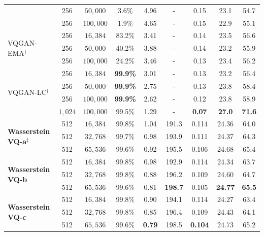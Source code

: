 \begin{table}[!t]
{\begin{tabular}{@{}lcccccccc@{}}
& 256 & $50{,}000$ & 3.6\%  & 4.96 & - & 0.15 & 23.1 & 54.7 \\
& 256 & $100{,}000$ & 1.9\%  & 4.65 & - & 0.15 & 22.9 & 55.1 \\
\midrule
\multirow{3}{*}{VQGAN-EMA$^{\dagger}$} & 256 & $16{,}384$ & 83.2\% & 3.41 & -  & 0.14 & 23.5 & 56.6 \\
& 256 & $50{,}000$ &  40.2\% & 3.88 & -  & 0.14 & 23.2 & 55.9 \\
& 256 & $100{,}000$ & 24.2\% & 3.46 & -  &  0.13 & 23.4 & 56.2 \\
\midrule
\multirow{4}{*}{VQGAN-LC$^{\dagger}$} & 256 & $16{,}384$ & \textbf{99.9\%}  & 3.01 & - & 0.13 & 23.2 & 56.4 \\
 & 256 & $50{,}000$ & \textbf{99.9\%}  & 2.75 & - & 0.13 &  23.8 &  58.4 \\
 & 256 & $100{,}000$ & \textbf{99.9\%}  & 2.62 & - &  0.12 &  23.8 & 58.9 \\
 & $1{,}024$& $100{,}000$ & 99.5\%  & 1.29 & - &  \textbf{0.07} &  \textbf{27.0} &  \textbf{71.6} \\\midrule
\midrule
\multirow{3}{*}{\textbf{Wasserstein VQ-a}$^{\ddagger}$} & 512 & $16{,}384$ & 99.8\% & 1.04 & 191.3 & 0.114 & 24.36 & 64.0 \\
& 512 & $32{,}768$&  99.7\% & 0.98 &  193.9 & 0.111 & 24.37 & 64.3 \\
& 512 & $65{,}536$& 99.6\% & 0.92 & 195.5 & 0.106 & 24.68 & 65.4 \\\midrule
\multirow{3}{*}{\textbf{Wasserstein VQ-b}} & 512 & $16{,}384$ & 99.8\% & 0.98 & 192.9 & 0.114 & 24.34 & 63.7\\
& 512 & $32{,}768$& 99.8\% & 0.88 & 196.2 & 0.109 & 24.60 & 64.7 \\
& 512 & $65{,}536$& 99.6\% & 0.81 & \textbf{198.7} & 0.105 & \textbf{24.77} & \textbf{65.5}\\\midrule
\multirow{3}{*}{\textbf{Wasserstein VQ-c}} & 512 & $16{,}384$ & 99.8\% & 0.90 & 194.1 & 0.114 & 24.27 & 63.4\\
& 512 & $32{,}768$& 99.8\% & 0.85 & 196.4 & 0.109 & 24.43 & 64.1 \\
& 512 & $65{,}536$& 99.6\% & \textbf{0.79} & 198.5 & \textbf{0.104} & 24.73 & 65.2 \\
\bottomrule
\end{tabular}}
\vspace{-3ex}
\label{tab:reconstruction_IN-main table}
\end{table}

